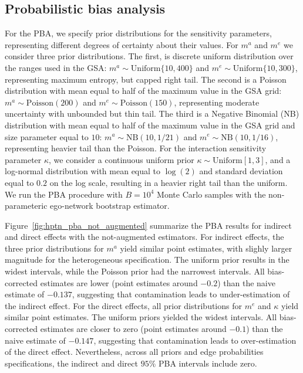 \documentclass[11pt]{article}
\theoremstyle{definition}
\begin{document}
\subsection{Probabilistic bias analysis}
\label{subsec:hptn_pba}
For the PBA, we specify prior distributions for the sensitivity parameters,
representing different degrees of certainty about their values.
For $m^a$ and $m^e$ we consider three prior distributions. 
The first, is discrete uniform distribution over the ranges used in the GSA:
$m^a \sim \text{Uniform}\{10,400\}$ and $m^e \sim \text{Uniform}\{10,300\}$,
representing maximum entropy, but capped right tail.
The second is a Poisson distribution with mean equal to half of the maximum value in the GSA grid:
$m^a \sim \text{Poisson}(200)$ and $m^e \sim \text{Poisson}(150)$,
representing moderate uncertainty with unbounded but thin tail.
The third is a Negative Binomial (NB) distribution with mean equal to half of the maximum value in the GSA grid
 and size parameter equal to $10$: 
$m^a \sim \text{NB}(10,1/21)$ and $m^e \sim \text{NB}(10,1/16)$,
representing heavier tail than the Poisson.
For the interaction sensitivity parameter $\kappa$, we consider a 
continuous uniform prior
$\kappa \sim \text{Uniform}[1,3]$, 
and a log-normal distribution with mean equal to $\log(2)$ and standard deviation equal to $0.2$ on the log scale,
resulting in a heavier right tail than the uniform.
We run the PBA procedure with $B=10^4$ Monte Carlo samples with 
the non-parameteric ego-network bootstrap estimator.

Figure~\ref{fig:hptn_pba_not_augmented}
 summarize the PBA results for indirect and direct effects
 with the not-augmented estimators.
 For indirect effects, the three prior distributions for $m^a$ yield similar point estimates,
 with slighly larger magnitude for the heterogeneous specification.
 The uniform prior results in the widest intervals,
  while the Poisson prior had the narrowest intervals.
  All bias-corrected estimates are lower (point estimates around $-0.2$) than the naive estimate of $-0.137$,
   suggesting that contamination leads to under-estimation of the indirect effect.
For the direct effects, all prior distributions for $m^e$ and $\kappa$ yield similar point estimates.
 The uniform priors yielded the widest intervals.
  All bias-corrected estimates are closer to zero (point estimates around $-0.1$) than the naive estimate of $-0.147$,
   suggesting that contamination leads to over-estimation of the direct effect.
Nevertheless, across all priors and edge probabilities specifications, the indirect and direct $95\%$ PBA intervals 
 include zero.
\end{document}
